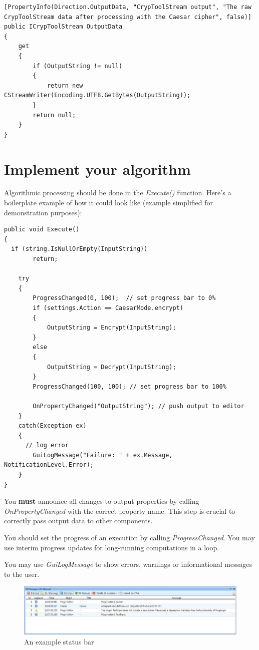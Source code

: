 \begin{lstlisting}
[PropertyInfo(Direction.OutputData, "CrypToolStream output", "The raw CrypToolStream data after processing with the Caesar cipher", false)]
public ICrypToolStream OutputData
{
	get
	{
		if (OutputString != null)
		{
			return new CStreamWriter(Encoding.UTF8.GetBytes(OutputString));
		}
		return null;
	}
}
\end{lstlisting}

\section{Implement your algorithm}
\label{sec:ImplementingTheActualAlgorithm}

Algorithmic processing should be done in the \textit{Execute()} function. Here's a boilerplate example of how it could look like (example simplified for demonstration purposes):

\begin{lstlisting}
public void Execute()
{
  if (string.IsNullOrEmpty(InputString))
		return;
	
	try
	{
		ProgressChanged(0, 100);  // set progress bar to 0%
		if (settings.Action == CaesarMode.encrypt)
		{
			OutputString = Encrypt(InputString);
		}
		else
		{
			OutputString = Decrypt(InputString);
		}
		ProgressChanged(100, 100); // set progress bar to 100%
		
		OnPropertyChanged("OutputString"); // push output to editor
	}
	catch(Exception ex)
	{
	  // log error
		GuiLogMessage("Failure: " + ex.Message, NotificationLevel.Error);
	}
}
\end{lstlisting}

You \textbf{must} announce all changes to output properties by calling \textit{OnPropertyChanged} with the correct property name. This step is crucial to correctly pass output data to other components.

You should set the progress of an execution by calling \textit{ProgressChanged}. You may use interim progress updates for long-running computations in a loop.

You may use \textit{GuiLogMessage} to show errors, warnings or informational messages to the user.

\begin{figure}[h]
	\centering
		\includegraphics[width=1.00\textwidth]{figures/status_bar.jpg}
	\caption{An example status bar}
	\label{fig:status_bar}
\end{figure}

